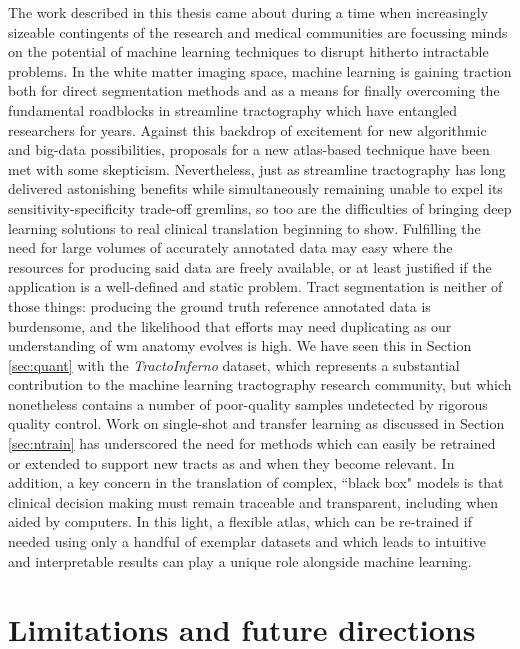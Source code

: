 The work described in this thesis came about during a time when increasingly sizeable contingents of the research and medical communities are focussing minds on the potential of machine learning techniques to disrupt hitherto intractable problems.
In the white matter imaging space, machine learning is gaining traction both for direct segmentation methods and as a means for finally overcoming the fundamental roadblocks in streamline tractography which have entangled researchers for years.
Against this backdrop of excitement for new algorithmic and big-data possibilities, proposals for a new atlas-based technique have been met with some skepticism.
Nevertheless, just as streamline tractography has long delivered astonishing benefits while simultaneously remaining unable to expel its sensitivity-specificity trade-off gremlins, so too are the difficulties of bringing deep learning solutions to real clinical translation beginning to show.
Fulfilling the need for large volumes of accurately annotated data may easy where the resources for producing said data are freely available, or at least justified if the application is a well-defined and static problem.
Tract segmentation is neither of those things: producing the ground truth reference annotated data is burdensome, and the likelihood that efforts may need duplicating as our understanding of \gls{wm} anatomy evolves is high.
We have seen this in Section \ref{sec:quant} with the \textit{TractoInferno} dataset, which represents a substantial contribution to the machine learning tractography research community, but which nonetheless contains a number of poor-quality samples undetected by rigorous quality control.
Work on single-shot and transfer learning as discussed in Section \ref{sec:ntrain} has underscored the need for methods which can easily be retrained or extended to support new tracts as and when they become relevant.
In addition, a key concern in the translation of complex, ``black box" models is that clinical decision making must remain traceable and transparent, including when aided by computers.
In this light, a flexible atlas, which can be re-trained if needed using only a handful of exemplar datasets and which leads to intuitive and interpretable results can play a unique role alongside machine learning.

\section{Limitations and future directions}\label{sec:future}

